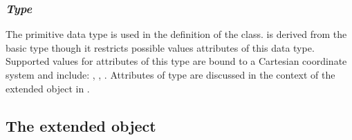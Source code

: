 %
%

\subsubsection{\emph{Type} }
\label{dat:CoordKind}

The  primitive data type is used in the definition of the \CoordinateComponent class.  is derived from the basic  type  though it restricts possible values attributes of this data type. Supported values for attributes of this type are bound to a Cartesian coordinate system and include: , , . Attributes of  type are discussed in the context of the extended \Compartment object in .


\subsection{The extended  object}
\label{subsec:extEvent}

